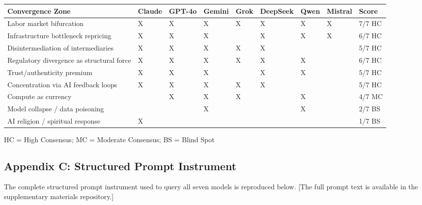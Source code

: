 \documentclass{article}
\begin{document}
\begin{table}[htbp]
\centering
\begin{tabular}{lllllllll}
\toprule
\textbf{Convergence Zone} & \textbf{Claude} & \textbf{GPT-4o} & \textbf{Gemini} & \textbf{Grok} & \textbf{DeepSeek} & \textbf{Qwen} & \textbf{Mistral} & \textbf{Score} \\
\midrule
Labor market bifurcation & X & X & X & X & X & X & X & 7/7 HC \\
Infrastructure bottleneck repricing & X & X & X &  & X & X & X & 6/7 HC \\
Disintermediation of intermediaries & X & X & X & X & X &  &  & 5/7 HC \\
Regulatory divergence as structural force & X & X & X & X & X & X &  & 6/7 HC \\
Trust/authenticity premium & X & X & X &  & X & X &  & 5/7 HC \\
Concentration via AI feedback loops & X & X & X & X & X &  &  & 5/7 HC \\
Compute as currency &  & X & X & X &  & X &  & 4/7 MC \\
Model collapse / data poisoning &  &  & X &  &  & X &  & 2/7 BS \\
AI religion / spiritual response & X &  &  &  &  &  &  & 1/7 BS \\
\bottomrule
\end{tabular}
\end{table}

HC = High Consensus; MC = Moderate Consensus; BS = Blind Spot


\subsection{Appendix C: Structured Prompt Instrument}
\label{sec:appendix_c_structured_prompt_instrument}

The complete structured prompt instrument used to query all seven models is reproduced below. [The full prompt text is available in the supplementary materials repository.]




\end{document}
